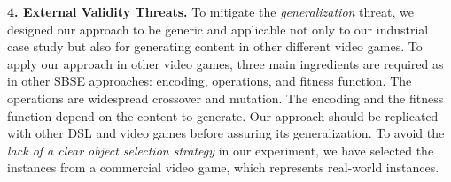 \textbf{4. External Validity Threats.}
To mitigate the \textit{generalization} threat, we designed our approach to be generic and applicable not only to our industrial case study but also for generating content in other different video games. To apply our approach in other video games, three main ingredients are required as in other SBSE approaches: encoding, operations, and fitness function. The operations are widespread crossover and mutation. The encoding and the fitness function depend on the content to generate. Our approach should be replicated with other DSL and video games before assuring its generalization.
To avoid the \textit{lack of a clear object selection strategy} in our experiment, we have selected the instances from a commercial video game, which represents real-world instances.

